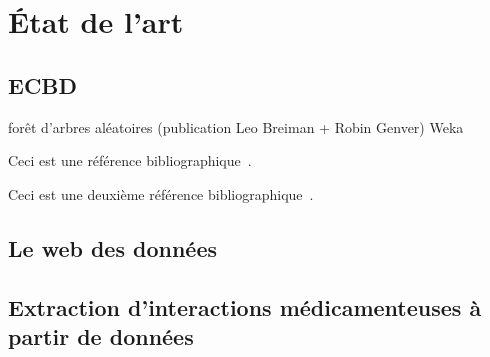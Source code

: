 \chapter{État de l'art}

\section{ECBD}

forêt d'arbres aléatoires (publication Leo Breiman + Robin Genver)
Weka

Ceci est une référence bibliographique~\cite{GOT4}.

Ceci est une deuxième référence bibliographique~\cite{lol}.

\section{Le web des données}

\section{Extraction d'interactions médicamenteuses à partir de données}

